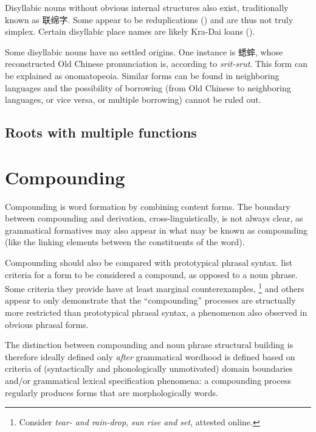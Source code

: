 \documentclass[UTF8, a4paper, oneside, scheme=plain, 12pt]{ctexrep}
\newcommand*{\citepage}[1]{p.~{#1}}
\newcommand*{\citepages}[1]{pp.~{#1}}
\newcommand{\form}[1]{\emph{#1}}
\begin{document}
Disyllabic nouns without obvious internal structures also exist,
traditionally known as 联绵字.
Some appear to be reduplications () and are thus not truly simplex.
Certain disyllabic place names are likely Kra-Dai loans ().

Some disyllabic nouns have no settled origins. 
One instance is 蟋蟀, whose reconstructed Old Chinese pronunciation is, according to \citet[\citepage{290}]{baxter2014old} \form{srit-srut}.
This form can be explained as onomatopeoia.
Similar forms can be found in neighboring languages and the possibility of borrowing (from Old Chinese to neighboring languages, or vice versa, or multiple borrowing) cannot be ruled out.

\subsection{Roots with multiple functions}

\section{Compounding}\label{sec:nouns.derivation.compounding}

Compounding is word formation by combining content forms.
The boundary between compounding and derivation, cross-linguistically, is not always clear,
as grammatical formatives may also appear in what may be known as compounding 
(like the linking elements between the constituents of the word).

Compounding should also be compared with prototypical phrasal syntax.
\citet[\citepages{448-451}]{cgel} list criteria for a form to be considered a compound,
as opposed to a noun phrase.
Some criteria they provide have at least marginal counterexamples,%
\footnote{
    Consider \form{tear- and rain-drop}, \form{sun rise and set}, attested online.
}
and others appear to only demonstrate that the ``compounding'' processes are structually more restricted than prototypical phrasal syntax,
a phenomenon also observed in obvious phrasal forms.

The distinction between compounding and noun phrase structural building is therefore 
ideally defined only \emph{after} grammatical wordhood is defined
based on criteria of (syntactically and phonologically unmotivated) domain boundaries
and/or grammatical lexical specification phenomena:
a compounding process regularly produces forms that are morphologically words.
\end{document}

